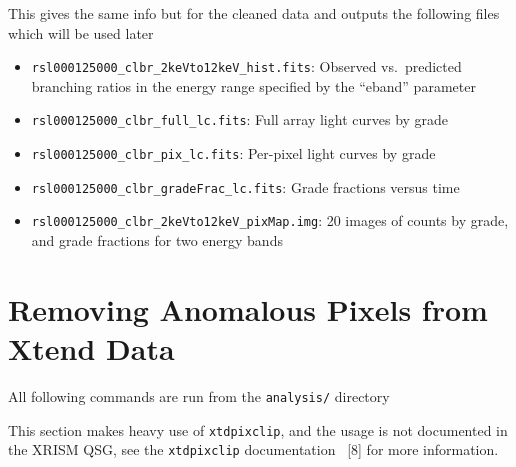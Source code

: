 \documentclass[
  letterpaper,
  DIV=11,
  numbers=noendperiod]{scrreprt}
\providecommand{\tightlist}{%
  \setlength{\itemsep}{0pt}\setlength{\parskip}{0pt}}
\begin{document}
This gives the same info but for the cleaned data and outputs the
following files which will be used later

\begin{itemize}
\tightlist
\item
  \texttt{rsl000125000\_clbr\_2keVto12keV\_hist.fits}: Observed
  vs.~predicted branching ratios in the energy range specified by the
  ``eband'' parameter
\item
  \texttt{rsl000125000\_clbr\_full\_lc.fits}: Full array light curves by
  grade
\item
  \texttt{rsl000125000\_clbr\_pix\_lc.fits}: Per-pixel light curves by
  grade
\item
  \texttt{rsl000125000\_clbr\_gradeFrac\_lc.fits}: Grade fractions
  versus time
\item
  \texttt{rsl000125000\_clbr\_2keVto12keV\_pixMap.img}: 20 images of
  counts by grade, and grade fractions for two energy bands
\end{itemize}

\section{Removing Anomalous Pixels from Xtend
Data}\label{removing-anomalous-pixels-from-xtend-data}

\begin{tcolorbox}[enhanced jigsaw, arc=.35mm, bottomrule=.15mm, bottomtitle=1mm, breakable, colback=white, colbacktitle=quarto-callout-important-color!10!white, colframe=quarto-callout-important-color-frame, coltitle=black, left=2mm, leftrule=.75mm, opacityback=0, opacitybacktitle=0.6, rightrule=.15mm, title=\textcolor{quarto-callout-important-color}{\faExclamation}\hspace{0.5em}{Important}, titlerule=0mm, toprule=.15mm, toptitle=1mm]

All following commands are run from the \texttt{analysis/} directory

\end{tcolorbox}

\begin{tcolorbox}[enhanced jigsaw, arc=.35mm, bottomrule=.15mm, bottomtitle=1mm, breakable, colback=white, colbacktitle=quarto-callout-note-color!10!white, colframe=quarto-callout-note-color-frame, coltitle=black, left=2mm, leftrule=.75mm, opacityback=0, opacitybacktitle=0.6, rightrule=.15mm, title=\textcolor{quarto-callout-note-color}{\faInfo}\hspace{0.5em}{Note}, titlerule=0mm, toprule=.15mm, toptitle=1mm]

This section makes heavy use of \texttt{xtdpixclip}, and the usage is
not documented in the XRISM QSG, see the \texttt{xtdpixclip}
documentation ~{[}8{]} for more information.

\end{tcolorbox}
\end{document}
